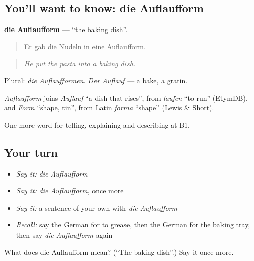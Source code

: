 \subsection*{You'll want to know: die Auflaufform}
\textbf{die Auflaufform} — \textquotedblleft{}the baking dish\textquotedblright{}.

\begin{quote}
Er gab die Nudeln in eine Auflaufform.
\end{quote}

\begin{quote}
\emph{He put the pasta into a baking dish.}
\end{quote}

Plural: \emph{die Auflaufformen}. \emph{Der Auflauf} — a bake, a gratin.

\begin{cousinweb}
\emph{Auflaufform} joins \emph{Auflauf} \textquotedblleft{}a dish that rises\textquotedblright{}, from \emph{laufen} \textquotedblleft{}to run\textquotedblright{} (EtymDB), and \emph{Form} \textquotedblleft{}shape, tin\textquotedblright{}, from Latin \emph{forma} \textquotedblleft{}shape\textquotedblright{} (Lewis \& Short).
\end{cousinweb}

\begin{grammarlens}[title={What you've built}]
One more word for telling, explaining and describing at B1.
\end{grammarlens}

\subsection*{Your turn}
\begin{itemize}
\raggedright
  \item \emph{Say it:} \emph{die Auflaufform}
  \item \emph{Say it:} \emph{die Auflaufform}, once more
  \item \emph{Say it:} a sentence of your own with \emph{die Auflaufform}
  \item \emph{Recall:} say the German for to grease, then the German for the baking tray, then say \emph{die Auflaufform} again
\end{itemize}

\begin{tcolorbox}[breakable,colback=teal!4,colframe=teal!35!black,title={Before you move on}]
What does die Auflaufform mean? (\textquotedblleft{}The baking dish\textquotedblright{}.) Say it once more.
\end{tcolorbox}
